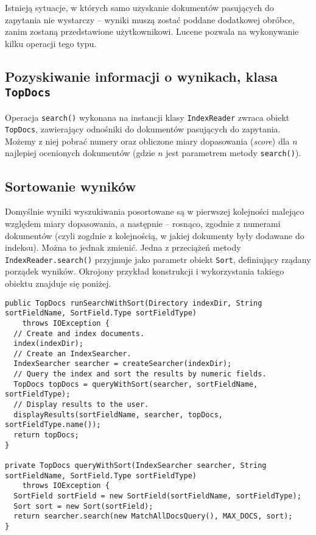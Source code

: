 Istnieją sytuacje, w których samo uzyskanie dokumentów pasujących do zapytania nie wystarczy -- wyniki muszą zostać poddane dodatkowej obróbce, zanim zostaną przedstawione użytkownikowi. Lucene pozwala na wykonywanie kilku operacji tego typu.

\subsection{Pozyskiwanie informacji o wynikach, klasa \texttt{TopDocs}}

Operacja \texttt{search()} wykonana na instancji klasy \texttt{IndexReader} zwraca obiekt \texttt{TopDocs}, zawierający odnośniki do dokumentów pasujących do zapytania. Możemy z niej pobrać numery oraz obliczone miary dopasowania (\emph{score}) dla $n$ najlepiej ocenionych dokumentów (gdzie $n$ jest parametrem metody \texttt{search()}).

\subsection{Sortowanie wyników}

Domyślnie wyniki wyszukiwania posortowane są w pierwszej kolejności malejąco względem miary dopasowania, a następnie -- rosnąco, zgodnie z numerami dokumentów (czyli zogdnie z kolejnością, w jakiej dokumenty były dodawane do indeksu). Można to jednak zmienić. Jedna z przeciążeń metody \texttt{IndexReader.search()} przyjmuje jako parametr obiekt \texttt{Sort}, definiujący rządany porządek wyników. Okrojony przykład konstrukcji i wykorzystania takiego obiektu znajduje się poniżej.

\begin{lstlisting}
public TopDocs runSearchWithSort(Directory indexDir, String sortFieldName, SortField.Type sortFieldType)
    throws IOException {
  // Create and index documents.  
  index(indexDir);
  // Create an IndexSearcher.
  IndexSearcher searcher = createSearcher(indexDir);
  // Query the index and sort the results by numeric fields.
  TopDocs topDocs = queryWithSort(searcher, sortFieldName, sortFieldType);
  // Display results to the user.
  displayResults(sortFieldName, searcher, topDocs, sortFieldType.name());
  return topDocs;
}

private TopDocs queryWithSort(IndexSearcher searcher, String sortFieldName, SortField.Type sortFieldType)
    throws IOException {
  SortField sortField = new SortField(sortFieldName, sortFieldType);
  Sort sort = new Sort(sortField);
  return searcher.search(new MatchAllDocsQuery(), MAX_DOCS, sort);
}
\end{lstlisting}

